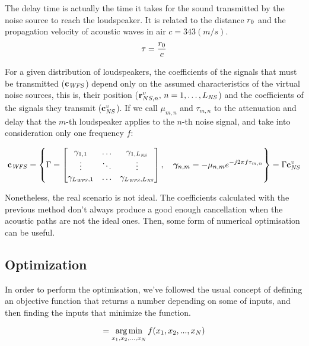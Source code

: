 The delay time is actually the time it takes for the sound transmitted by the noise source to reach the loudspeaker. It is related to the distance $r_0$ and the propagation velocity of acoustic waves in air $c = 343 (m/s)$.
\begin{equation}
	\tau = \frac{r_0}{c} \label{WFScalcEqDelay}
\end{equation}

For a given distribution of loudspeakers, the coefficients of the signals that must be transmitted ($\mathbf{c}_{\mathit{WFS}}$) depend only on the assumed characteristics of the virtual noise sources, this is, their position ($\mathbf{r}_{NS, n}^v,\, n = 1, \ldots, L_\mathit{NS}$) and the coefficients of the signals they transmit ($\mathbf{c}_{\mathit{NS}}^v$). If we call $\mu_{m,n}$ and $\tau_{m,n}$ to the attenuation and delay that the $m$-th loudspeaker applies to the $n$-th noise signal, and take into consideration only one frequency $f$:

\begin{equation}
\cwfs = 
 \left\{ \wfsNormCoef[mat] = \begin{bmatrix}
\wfsNormCoef[scalar]_{1,1} & \ldots & \wfsNormCoef[scalar]_{1,\numNS} \\
\vdots & \ddots & \vdots \\
\wfsNormCoef[scalar]_{\numWFS,1} & \ldots & \wfsNormCoef[scalar]_{\numWFS,\numNS}
\end{bmatrix},\quad \wfsNormCoef_{n,m} = -\mu_{n,m} e^{-j 2 \pi f \tau_{m,n}} 
\right\}
= \wfsNormCoef[mat] \cns^v
\label{defaultWFScoeffGTAC}
\end{equation}

Nonetheless, the real scenario is not ideal. The coefficients calculated with the previous method don't always produce a good enough cancellation when the acoustic paths are not the ideal ones. Then, some form of numerical optimisation can be useful.

\subsection{Optimization} \label{optimization}
In order to perform the optimisation, we've followed the usual concept of defining an objective function that returns a number depending on some of inputs, and then finding the inputs that minimize the function.

\begin{equation}
[x_{\mathit{opt} (1)}, x_{\mathit{opt} (2)}, ..., x_{\mathit{opt} (N)}] = \argmin_{x_1, x_2, ..., x_N} f(x_1, x_2, ..., x_N)
\label{optimisationGeneral}
\end{equation}

